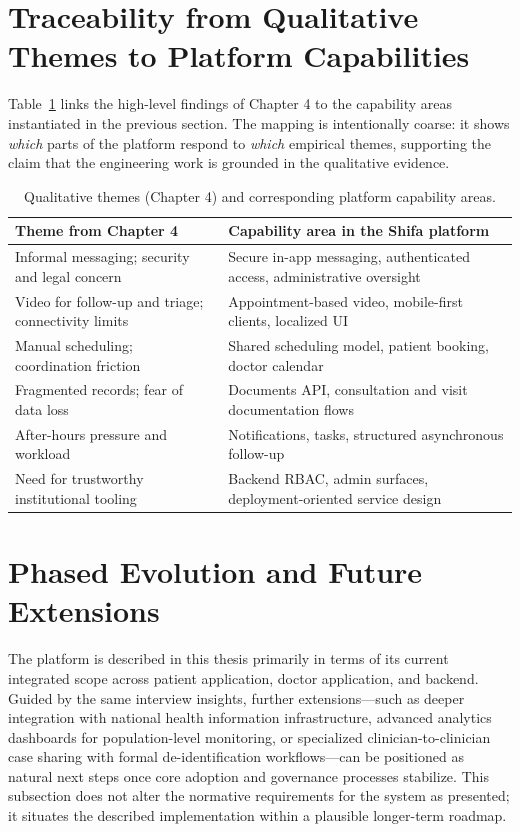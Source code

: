 \section{Traceability from Qualitative Themes to Platform Capabilities}

Table~\ref{tab:traceability-themes-capabilities} links the high-level findings of Chapter 4 to the capability areas instantiated in the previous section. The mapping is intentionally coarse: it shows \emph{which} parts of the platform respond to \emph{which} empirical themes, supporting the claim that the engineering work is grounded in the qualitative evidence.

\begin{table}[H]
\centering
\caption{Qualitative themes (Chapter 4) and corresponding platform capability areas.}
\label{tab:traceability-themes-capabilities}
\begin{tabularx}{\textwidth}{@{}>{\RaggedRight\arraybackslash}X>{\RaggedRight\arraybackslash}X@{}}
\toprule
\textbf{Theme from Chapter 4} & \textbf{Capability area in the Shifa platform}\\
\midrule
Informal messaging; security and legal concern & Secure in-app messaging, authenticated access, administrative oversight\\
Video for follow-up and triage; connectivity limits & Appointment-based video, mobile-first clients, localized UI\\
Manual scheduling; coordination friction & Shared scheduling model, patient booking, doctor calendar\\
Fragmented records; fear of data loss & Documents API, consultation and visit documentation flows\\
After-hours pressure and workload & Notifications, tasks, structured asynchronous follow-up\\
Need for trustworthy institutional tooling & Backend RBAC, admin surfaces, deployment-oriented service design\\
\bottomrule
\end{tabularx}
\end{table}

\section{Phased Evolution and Future Extensions}

The platform is described in this thesis primarily in terms of its current integrated scope across patient application, doctor application, and backend. Guided by the same interview insights, further extensions---such as deeper integration with national health information infrastructure, advanced analytics dashboards for population-level monitoring, or specialized clinician-to-clinician case sharing with formal de-identification workflows---can be positioned as natural next steps once core adoption and governance processes stabilize. This subsection does not alter the normative requirements for the system as presented; it situates the described implementation within a plausible longer-term roadmap.

